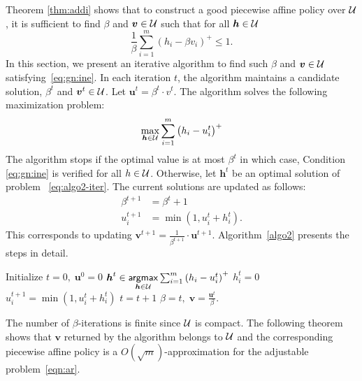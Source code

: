 \documentclass[11pt]{article}
\theoremstyle{plain}
\theoremstyle{definition}
\numberwithin{equation}{section}%
\numberwithin{equation}{section}%
\newcommand{\mb}[1]{\ensuremath{\boldsymbol{#1}}}
\newcommand*{\red}{\textcolor{black}}
\begin{document}
Theorem \ref{thm:addi} shows that to construct a good piecewise affine policy over ${\cal U}$, it is sufficient to find $\beta$ and $\mb v \in {\cal U}$  such that for all $\mb h \in {\cal U}$
\begin{equation} \label{eq:gn:ine}
  \frac{1}{\beta} \sum_{i=1}^m \left( h_i -\beta v_i  \right)^{+} \leq 1 .
\end{equation}
In this section, we present an iterative algorithm to find such $\beta$ and $\mb v \in {\cal U}$ satisfying~\eqref{eq:gn:ine}. In each iteration $t$, the algorithm maintains a candidate solution, $\beta^t$ and $\mb v^t \in {\cal U}$. Let $\mb u^t = \beta^t \cdot v^t$.  The algorithm solves the following maximization problem:
\begin{equation}\label{eq:algo2-iter}
\max_{\mb h \in {\cal U}} \sum_{i=1}^m \left( h_i - u^t_i  \right)^{+}
\end{equation}
The algorithm stops if the optimal value is at most $\beta^t$ in which case, Condition \eqref{eq:gn:ine} is verified for all $h \in {\cal U}$. Otherwise, let $\mb h^t$ be an optimal solution of problem ~\eqref{eq:algo2-iter}. The current solutions are updated as follows:
\[
\begin{aligned}
\beta^{t+1} & = \beta^t + 1 \\
u^{t+1}_i & = \min \left( 1, u^t_i + h^t_i\right).
\end{aligned}
\]
This corresponds to updating $\mb v^{t+1} = \frac{1}{\beta^{t+1}} \cdot \mb u^{t+1}$. Algorithm~\ref{algo2} presents the steps in detail.

\begin{algorithm}[t]
\caption{Computing $\beta$  and $\mb v$ for general uncertainty sets}\label{algo2}
\begin{algorithmic}[1]
\State Initialize $ t =0, \;  \mb u^0 =0$
\While{ $  \left\{  \underset{\mb h \in {\cal U}} \max \sum_{i=1}^m \left( h_i-u_i^t\right)^+ > t  \right\} $}
\State $ \mb h^t \in  \underset{\mb h \in {\cal U}}{  \sf argmax} \sum_{i=1}^m \left( h_i-u_i^t \right)^+$
   $ h_i^t= 0$ \EndIf
 \State $ u_i^{t+1}= \min ( 1, u_i^t +h_i^t)$
 \EndFor
\State $t  =t+1 $
\EndWhile
\State \Return $ \beta =t, \; \mb v= \frac{\mb u^t}{\beta}  . $
\end{algorithmic}
\end{algorithm}


The number of $ \beta$-iterations  is finite since ${\cal U}$ is compact.  The following theorem shows that $ \mb v $ returned by the algorithm belongs to ${\cal U}$ and the corresponding piecewise affine policy is a $O(\sqrt m)$-approximation for the adjustable  problem~\eqref{eqn:ar}.
\end{document}
